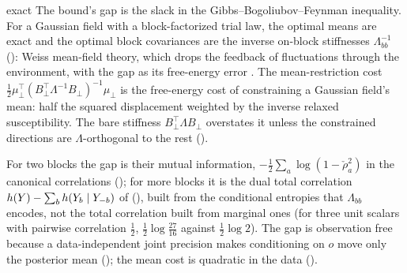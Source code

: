 \begin{analogy}{exact}
The bound's gap is the slack in the Gibbs--Bogoliubov--Feynman inequality. For a Gaussian field with a
block-factorized trial law, the optimal means are exact and the optimal block covariances are the inverse
on-block stiffnesses \(\Lambda_{bb}^{-1}\) (): Weiss mean-field
theory, which drops the feedback of fluctuations through the environment, with the gap as its
free-energy error \citep{Bishop2006,Wainwright2008}. The mean-restriction cost
\(\tfrac12\mu_\perp^\top(B_\perp^\top\Lambda^{-1}B_\perp)^{-1}\mu_\perp\) is the free-energy cost of
constraining a Gaussian field's mean: half the squared displacement weighted by the inverse relaxed
susceptibility. The bare stiffness \(B_\perp^\top\Lambda B_\perp\) overstates it unless the constrained
directions are \(\Lambda\)-orthogonal to the rest ().
\end{analogy}

For two blocks the gap is their mutual information, \(-\tfrac12\sum_a\log(1-\check\rho_a^2)\) in the
canonical correlations (); for more blocks it is the dual total
correlation \(h(Y)-\sum_bh(Y_b\mid Y_{-b})\) of \citet{Han1978}
(), built from the conditional entropies that
\(\Lambda_{bb}\) encodes, not the total correlation built from marginal ones (for three unit scalars with
pairwise correlation \(\tfrac12\), \(\tfrac12\log\tfrac{27}{16}\) against \(\tfrac12\log2\)). The gap is
observation free because a data-independent joint precision makes conditioning on \(o\) move only the
posterior mean (); the mean cost is quadratic in the data
().


